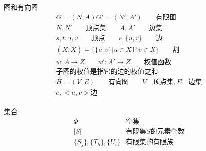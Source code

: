 \documentclass[twocolumn]{article}
\theoremstyle{nonumberplain}%
\begin{document}
\begin{appendices}
      \noindent 图和有向图
      \begin{equation}\nonumber
      \begin{aligned}
      &G=(N,A) G'=(N',A') \qquad \text{有限图}\\
      &N,N' \qquad \text{顶点集} \qquad A,A' \qquad \text{边集}\\
      &s,t,u,v \qquad \text{顶点} \qquad e,\{u,v\} \qquad \text{边}\\
      &(X,\bar{X})=\{\{u,v\}| u\in X\text{且}v\in \bar{X}\} \qquad \text{割}\\
      &w:A\rightarrow Z \qquad w':A'\rightarrow Z \qquad \text{权值函数}\\
      &\text{子图的权值是指它的边的权值之和}\\
      &H=(V,E) \qquad \text{有向图} \qquad V \quad \text{顶点集}, E \quad \text{边集}\\
      &e,<u,v> \text{边}
      \end{aligned}
      \end{equation}
      \\

      \noindent 集合
      \begin{equation}\nonumber
      \begin{aligned}
      &\Phi& \text{空集} \\
      &|S| & \text{有限集}S\text{的元素个数} \\
      &\{S_j\},\{T_h\},\{U_i\}&\text{有限集的有限族}
      \end{aligned}
      \end{equation}
    \end{appendices}








\end{document}
